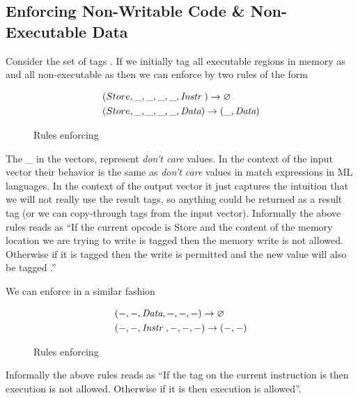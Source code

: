 \subsection{Enforcing Non-Writable Code \& Non-Executable Data}
\label{sec:nwc_nxd}

Consider the set of tags \TAGS{\DATA,\INSTRname}. If we initially tag
all executable regions in memory as \INSTR{} and all non-executable as \DATAname
then we can enforce \NWC by two rules of the form

\begin{figure}[!htpb]
\begin{align*}
 & (Store, \_,\_, \_, \_,\textit{Instr}~) \rightarrow \varnothing \\
 & (Store, \_,\_, \_, \_,\textit{Data}) \rightarrow (\_, \textit{Data})
\end{align*}
\caption{Rules enforcing \NWC}
\end{figure}

The \_ in the vectors, represent \textit{don't care} values. In the context of
the input vector their behavior is the same as \textit{don't care} values in
match expressions in ML languages. In the context of the output vector it just
captures the intuition that we will not really use the result tags, so anything
could be returned as a result tag (\IE \DATAname or we can copy-through tags
from the input vector).
Informally the above rules reads as ``If the current opcode is Store and the
content of the memory location we are trying to write is tagged \INSTR{}
then the memory write is not allowed. Otherwise if it is tagged \DATAname then
the write is permitted and the new value will also be tagged \DATA.''

We can enforce \NXD in a similar fashion
\begin{figure}[!htpb]
\begin{align*}
 & (-, -,\textit{Data}, -, -, -) \rightarrow \varnothing \\
 & (-, -,\textit{Instr}~, -, -,-) \rightarrow (-, -)
\end{align*}
\caption{Rules enforcing \NXD}
\end{figure}

Informally the above rules reads as ``If the tag on the current instruction is
\DATAname then execution is not allowed. Otherwise if it is \INSTRname then
execution is allowed''.

\\
\\

